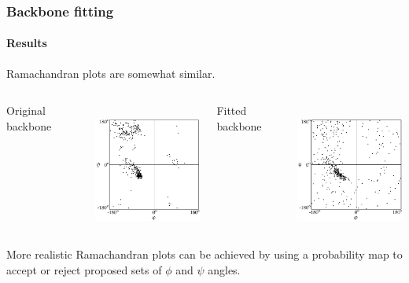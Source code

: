 \documentclass{beamer}
\begin{document}
\begin{frame}[t, fragile]
\frametitle{Backbone fitting} 
\framesubtitle{Results}

Ramachandran plots are somewhat similar.

\vspace*{2mm}
\begin{columns}[c]
\column{1.7in}
\centering
\begin{small}Original backbone\end{small}
\\
\hspace*{-.33cm}\includegraphics[width=1.7in]{plot_ramachandran_orig}

\column{1.7in}
\centering
\begin{small}Fitted backbone\end{small}
\\
\hspace*{-.4cm}\includegraphics[width=1.7in]{plot_ramachandran}
\end{columns}
\vspace*{2mm}

More realistic Ramachandran plots can be achieved by using a probability map to accept or reject proposed sets of $\phi$ and $\psi$ angles.

\end{frame}



\end{document}
